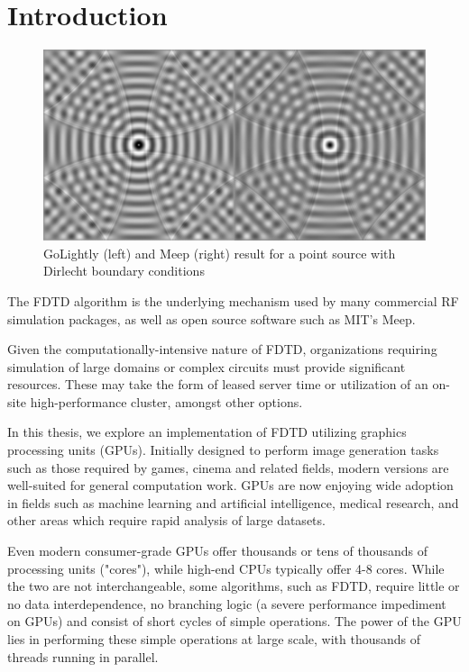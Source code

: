 \chapter{Introduction} \label{ch:introduction}

\begin{figure}[H]
	\centering
	\includegraphics[width=\textwidth,
	keepaspectratio]{point-source-comparison.jpg}
	\caption{GoLightly (left) and Meep (right) result for a point source with Dirlecht boundary conditions}
	\label{fig:pointSourceComparison}
\end{figure}


The FDTD \cite{Yee} algorithm is the underlying mechanism used by many commercial RF simulation packages, as well as open source software such as MIT's Meep\cite{OskooiRo10}. 

Given the computationally-intensive nature of FDTD, organizations requiring simulation of large domains or complex circuits must provide significant resources. These may take the form of leased server time or utilization of an on-site high-performance cluster, amongst other options.

In this thesis, we explore an implementation of FDTD utilizing graphics processing units (GPUs). Initially designed to perform image generation tasks such as those required by games, cinema and related fields, modern versions are well-suited for general computation work. GPUs are now enjoying wide adoption in fields such as machine learning\cite{Raina09largescaledeep} and artificial intelligence\cite{wu2009clustering}, medical research\cite{QIMS1079}, and other areas which require rapid analysis of large datasets.

Even modern consumer-grade GPUs offer thousands or tens of thousands of processing units ("cores"), while high-end CPUs typically offer 4-8 cores. While the two are not interchangeable, some algorithms, such as FDTD, require little or no data interdependence, no branching logic (a severe performance impediment on GPUs) and consist of short cycles of simple operations. The power of the GPU lies in performing these simple operations at large scale, with thousands of threads running in parallel. 

